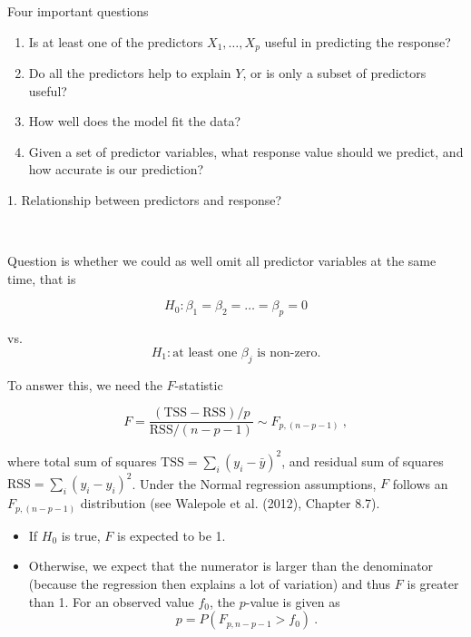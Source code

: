 \documentclass[10pt,ignorenonframetext,]{beamer}
\begin{document}
\begin{frame}{Four important questions}

\begin{enumerate}
\def\labelenumi{\arabic{enumi}.}
\item
  Is at least one of the predictors \(X_1, \ldots, X_p\) useful in
  predicting the response?
\item
  Do all the predictors help to explain \(Y\), or is only a subset of
  predictors useful?
\item
  How well does the model fit the data?
\item
  Given a set of predictor variables, what response value should we
  predict, and how accurate is our prediction?
\end{enumerate}

\end{frame}

\begin{frame}

\begin{block}{1. Relationship between predictors and response?}

\(~\)

Question is whether we could as well omit all predictor variables at the
same time, that is

\begin{center}
$$H_0: \beta_1=\beta_2=\ldots=\beta_p=0 $$

vs. 
$$H_1: \text{at least one } \beta_j \text{ is non-zero.}$$
\end{center}

\end{block}

\end{frame}

\begin{frame}

\vspace{4mm} To answer this, we need the \(F\)-statistic

\[F = \frac{(\text{TSS}-\text{RSS})/p}{\text{RSS}/(n-p-1)} \sim F_{p,(n-p-1)}\ ,\]

where total sum of squares \(\text{TSS}=\sum_i(y_i-\bar{y})^2\), and
residual sum of squares \(\text{RSS}=\sum_i(y_i-\hat{y}_i)^2\). Under
the Normal regression assumptions, \(F\) follows an \(F_{p,(n-p-1)}\)
distribution (see Walepole et al. (2012), Chapter 8.7).

\begin{itemize}
\item
  If \(H_0\) is true, \(F\) is expected to be 1.
\item
  Otherwise, we expect that the numerator is larger than the denominator
  (because the regression then explains a lot of variation) and thus
  \(F\) is greater than 1. For an observed value \(f_0\), the
  \(p\)-value is given as \[p =P(F_{p,n-p-1}> f_0) \ .\]
\end{itemize}

\end{frame}
\end{document}
